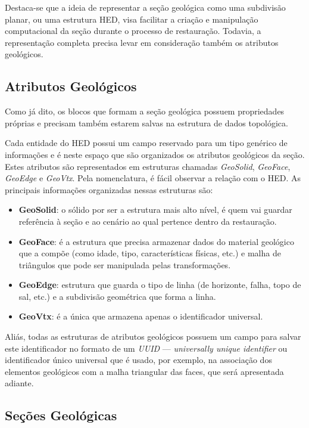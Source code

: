 Destaca-se que a ideia de representar a seção geológica como uma subdivisão planar, ou uma estrutura HED, visa facilitar a criação e manipulação computacional da seção durante o processo de restauração. Todavia, a representação completa precisa levar em consideração também os atributos geológicos.

\subsection{Atributos Geológicos}

Como já dito, os blocos que formam a seção geológica possuem propriedades próprias e precisam também estarem salvas na estrutura de dados topológica.

Cada entidade do HED possui um campo reservado para um tipo genérico de informações e é neste espaço que são organizados os atributos geológicos da seção. Estes atributos são representados em estruturas chamadas \textit{GeoSolid}, \textit{GeoFace}, \textit{GeoEdge} e \textit{GeoVtx}. Pela nomenclatura, é fácil observar a relação com o HED. As principais informações organizadas nessas estruturas são:

\renewcommand{\labelitemi}{•}
\begin{itemize}
  \item \textbf{GeoSolid}: o sólido por ser a estrutura mais alto nível, é quem vai guardar referência à seção e ao cenário ao qual pertence dentro da restauração.
  \item \textbf{GeoFace}: é a estrutura que precisa armazenar dados do material geológico que a compõe (como idade, tipo, características físicas, etc.) e malha de triângulos que pode ser manipulada pelas transformações.
  \item \textbf{GeoEdge}: estrutura que guarda o tipo de linha (de horizonte, falha, topo de sal, etc.) e a subdivisão geométrica que forma a linha. 
  \item \textbf{GeoVtx}: é a única que armazena apenas o identificador universal.
\end{itemize}

Aliás, todas as estruturas de atributos geológicos possuem um campo para salvar este identificador no formato de um \textit{UUID} --- \textit{universally unique identifier}\cite{UUID} ou identificador único universal que é usado, por exemplo, na associação dos elementos geológicos com a malha triangular das faces, que será apresentada adiante.

\subsection{Seções Geológicas} %




